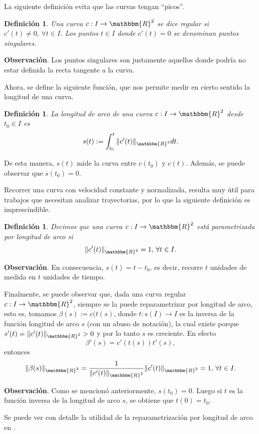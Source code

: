 \documentclass[a4paper,10pt]{book}
\newcommand{\R}{\mathbbm{R}}
\newcommand{\arr}{\rightarrow}
\newtheorem{defi}[teo]{Definici\'on}
\begin{document}
La siguiente definición evita que las curvas tengan ``picos''.

\begin{defi}
 Una curva $c:I\arr\R^2$ se dice regular si $c'(t)\neq0,\,\forall t\in I$. Los puntos $t\in I$ donde $c'(t)=0$ se denominan puntos singulares.
\end{defi}

\textbf{Observación}. Los puntos singulares son justamente aquellos donde podría no estar definida la recta tangente a la curva.

Ahora, se define la siguiente función, que nos permite medir en cierto sentido la longitud de una curva.

\begin{defi}
 La longitud de arco de una curva $c:I\arr\R^2$ desde $t_0\in I$ es $$ s(t):=\int_{t_0}^t\|c'(t)\|_{\R^2}dt.$$
\end{defi}
De esta manera, $s(t)$ mide la curva entre $c(t_0)$ y $c(t)$. Además, se puede observar que $s(t_0)=0$.

Recorrer una curva con velocidad constante y normalizada, resulta muy útil para trabajos que necesitan analizar trayectorias, por lo que la siguiente definición es imprescindible.

\begin{defi}
 Decimos que una curva $c:I\arr\R^2$ está parametrizada por longitud de arco si $$\|c'(t)\|_{\R^2}=1,\,\forall t\in I.$$
\end{defi}

\textbf{Observación}. En consecuencia, $s(t)=t-t_0$, es decir, recorre $t$ unidades de medida en $t$ unidades de tiempo.

Finalmente, se puede observar que, dada una curva regular $c:I\arr\R^2$, siempre se la puede reparametrizar por longitud de arco, esto es, tomamos $\beta(s):=c(t(s)$, donde $t:s(I)\arr I$ es la inversa de la función longitud de arco $s$ (con un abuso de notación), la cual existe porque $s'(t)=\|c'(t)\|_{\R^2}>0$ y por lo tanto $s$ es creciente. En efecto $$\beta'(s)=c'(t(s))t'(s),$$
entonces $$\|\beta(s)\|_{\R^2}=\frac{1}{\|c'(t)\|_{\R^2}}\|c'(t)\|_{\R^2}=1,\,\forall t\in I.$$

\textbf{Observación}. Como se mencionó anteriormente, $s(t_0)=0$. Luego si $t$ es la función inversa de la longitud de arco $s$, se obtiene que $t(0)=t_0$.

Se puede ver con detalle la utilidad de la reparametrización por longitud de arco en \cite[Section 1-5.]{do1990geometria}.
\end{document}
